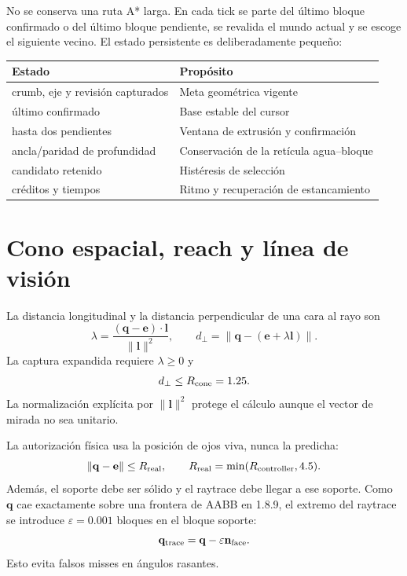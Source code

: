 \documentclass[11pt,a4paper]{article}
\begin{document}
No se conserva una ruta A* larga. En cada tick se parte del último bloque
confirmado o del último bloque pendiente, se revalida el mundo actual y se escoge
el siguiente vecino. El estado persistente es deliberadamente pequeño:
\begin{center}
\begin{tabular}{ll}
\toprule
Estado & Propósito \\
\midrule
crumb, eje y revisión capturados & Meta geométrica vigente \\
último confirmado & Base estable del cursor \\
hasta dos pendientes & Ventana de extrusión y confirmación \\
ancla/paridad de profundidad & Conservación de la retícula agua--bloque \\
candidato retenido & Histéresis de selección \\
créditos y tiempos & Ritmo y recuperación de estancamiento \\
\bottomrule
\end{tabular}
\end{center}

\section{Cono espacial, reach y línea de visión}

La distancia longitudinal y la distancia perpendicular de una cara al rayo son
\begin{equation}
 \lambda=\frac{(\mathbf q-\mathbf e)\cdot\mathbf l}{\|\mathbf l\|^2},
 \qquad
 d_\perp=\left\|\mathbf q-\left(\mathbf e+\lambda\mathbf l\right)\right\|.
\end{equation}
La captura expandida requiere $\lambda\geq0$ y
\begin{equation}
 d_\perp\leq R_{\rm cone}=1.25.
\end{equation}
La normalización explícita por $\|\mathbf l\|^2$ protege el cálculo aunque el
vector de mirada no sea unitario.

La autorización física usa la posición de ojos viva, nunca la predicha:
\begin{equation}
 \|\mathbf q-\mathbf e\|\leq R_{\rm real},
 \qquad R_{\rm real}=\min(R_{\rm controller},4.5).
\end{equation}
Además, el soporte debe ser sólido y el raytrace debe llegar a ese soporte. Como
$\mathbf q$ cae exactamente sobre una frontera de AABB en 1.8.9, el extremo del
raytrace se introduce $\varepsilon=0.001$ bloques en el bloque soporte:
\begin{equation}
 \mathbf q_{\rm trace}=\mathbf q-\varepsilon\mathbf n_{\rm face}.
\end{equation}
Esto evita falsos misses en ángulos rasantes.
\end{document}
